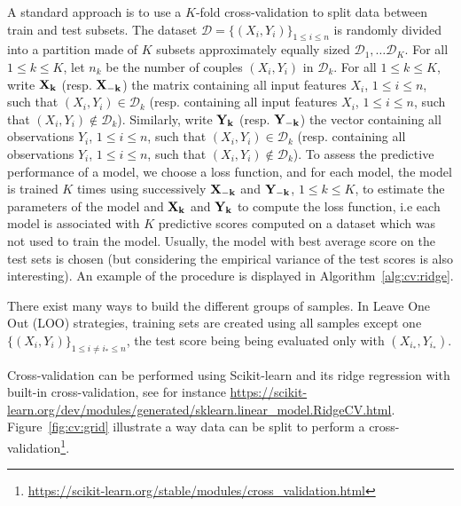 A standard approach is to use a $K$-fold cross-validation to split data between train and test subsets. The dataset $\mathcal{D} = \{(X_i,Y_i)\}_{1\leq i\leq n}$ is randomly divided into a partition made of $K$ subsets approximately equally sized $\mathcal{D}_1, \ldots \mathcal{D}_K$. For all $1\leqslant k \leqslant K$, let $n_k$ be the number of couples $(X_i,Y_i)$ in $\mathcal{D}_k$. For all $1\leqslant k \leqslant K$, write $\bf X_k$ (resp. $\bf X_{-k}$) the matrix containing all input features $X_i$, $1\leqslant i\leqslant n$, such that $(X_i,Y_i)\in \mathcal{D}_k$ (resp. containing all input features $X_i$, $1\leqslant i\leqslant n$, such that $(X_i,Y_i)\notin \mathcal{D}_k$). Similarly, write $\bf Y_k$ (resp. $\bf Y_{-k}$) the vector containing all observations $Y_i$, $1\leqslant i\leqslant n$, such that $(X_i,Y_i)\in \mathcal{D}_k$ (resp. containing all observations $Y_i$, $1\leqslant i\leqslant n$, such that $(X_i,Y_i)\notin \mathcal{D}_k$). To assess the predictive performance of a model, we choose a loss function, and for each model, the model is trained $K$ times using successively $\bf X_{-k}$ and $\bf Y_{-k}$, $1\leqslant k\leqslant K$, to estimate the parameters of the model and $\bf X_{k}$ and $\bf Y_{k}$ to compute the loss function, i.e each model is associated with $K$ predictive scores computed on a dataset which was not used to train the model. Usually, the model with best average score on the test sets is chosen (but considering the empirical variance of the test scores is also interesting). An example of the procedure is displayed in Algorithm~\ref{alg:cv:ridge}.

There exist many ways to build the different groups of samples. In Leave One Out (LOO) strategies,  training  sets are created using all samples except one $\{(X_i,Y_i)\}_{1\leqslant i\neq i_*\leqslant n}$, the test score being being evaluated only with $(X_{i_*},Y_{i_*})$. 

Cross-validation can be performed using Scikit-learn and its ridge regression with built-in cross-validation, see for instance \url{https://scikit-learn.org/dev/modules/generated/sklearn.linear\_model.RidgeCV.html}. Figure~\ref{fig:cv:grid} illustrate a way data can be split to perform a cross-validation\footnote{\url{https://scikit-learn.org/stable/modules/cross\_validation.html}}.

